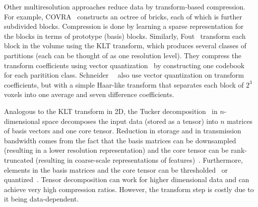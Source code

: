 Other multiresolution approaches reduce data by transform-based compression. For example,
COVRA~\cite{covra2012} constructs an octree of bricks, each of which is further subdivided  blocks.
Compression is done by learning a sparse representation for the blocks in terms of prototype (basis)
blocks. Similarly, Fout\etal~\cite{hw_dvr2007} transform each block in the volume using the KLT
transform, which produces several classes of partitions (each can be thought of as one resolution
level). They compress the transform coefficients using vector quantization~\cite{vq1992} by
constructing one codebook for each paritition class. Schneider~\etal~\cite{compression_domain2003}
also use vector quantization on transform coefficients, but with a simple Haar-like transform that
separates each block of $2^3$ voxels into one average and seven difference coefficients.

Analogous to the KLT transform in 2D, the Tucker decomposition~\cite{tensor_dvr2015} in
$n$-dimensional space decomposes the input data (stored as a tensor) into $n$ matrices of basis
vectors and one core tensor. Reduction in storage and in transmission bandwidth comes from the fact
that the basis matrices can be downsampled (resulting in a lower resolution representation) and the
core tensor can be rank-truncated (resulting in coarse-scale representations of
features)~\cite{tamresh,tucker-thresholding,multiscale-tensor}. Furthermore, elements in the basis
matrices and the core tensor can be thresholded~\cite{tucker-thresholding} or
quantized~\cite{tamresh,multiscale-tensor}. Tensor decomposition can work for higher dimensional
data and can achieve very high compression ratios. However, the transform step is costly due to it
being data-dependent.

